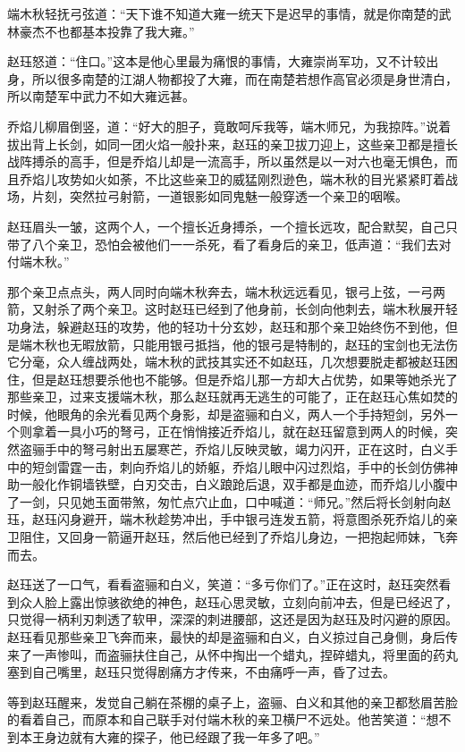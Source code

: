 端木秋轻抚弓弦道：“天下谁不知道大雍一统天下是迟早的事情，就是你南楚的武林豪杰不也都基本投靠了我大雍。”

赵珏怒道：“住口。”这本是他心里最为痛恨的事情，大雍崇尚军功，又不计较出身，所以很多南楚的江湖人物都投了大雍，而在南楚若想作高官必须是身世清白，所以南楚军中武力不如大雍远甚。

乔焰儿柳眉倒竖，道：“好大的胆子，竟敢呵斥我等，端木师兄，为我掠阵。”说着拔出背上长剑，如同一团火焰一般扑来，赵珏的亲卫拔刀迎上，这些亲卫都是擅长战阵搏杀的高手，但是乔焰儿却是一流高手，所以虽然是以一对六也毫无惧色，而且乔焰儿攻势如火如荼，不比这些亲卫的威猛刚烈逊色，端木秋的目光紧紧盯着战场，片刻，突然拉弓射箭，一道银影如同鬼魅一般穿透一个亲卫的咽喉。

赵珏眉头一皱，这两个人，一个擅长近身搏杀，一个擅长远攻，配合默契，自己只带了八个亲卫，恐怕会被他们一一杀死，看了看身后的亲卫，低声道：“我们去对付端木秋。”

那个亲卫点点头，两人同时向端木秋奔去，端木秋远远看见，银弓上弦，一弓两箭，又射杀了两个亲卫。这时赵珏已经到了他身前，长剑向他刺去，端木秋展开轻功身法，躲避赵珏的攻势，他的轻功十分玄妙，赵珏和那个亲卫始终伤不到他，但是端木秋也无暇放箭，只能用银弓抵挡，他的银弓是特制的，赵珏的宝剑也无法伤它分毫，众人缠战两处，端木秋的武技其实还不如赵珏，几次想要脱走都被赵珏困住，但是赵珏想要杀他也不能够。但是乔焰儿那一方却大占优势，如果等她杀光了那些亲卫，过来支援端木秋，那么赵珏就再无逃生的可能了，正在赵珏心焦如焚的时候，他眼角的余光看见两个身影，却是盗骊和白义，两人一个手持短剑，另外一个则拿着一具小巧的弩弓，正在悄悄接近乔焰儿，就在赵珏留意到两人的时候，突然盗骊手中的弩弓射出五屡寒芒，乔焰儿反映灵敏，竭力闪开，正在这时，白义手中的短剑雷霆一击，刺向乔焰儿的娇躯，乔焰儿眼中闪过烈焰，手中的长剑仿佛神助一般化作铜墙铁壁，白刃交击，白义踉跄后退，双手都是血迹，而乔焰儿小腹中了一剑，只见她玉面带煞，匆忙点穴止血，口中喊道：“师兄。”然后将长剑射向赵珏，赵珏闪身避开，端木秋趁势冲出，手中银弓连发五箭，将意图杀死乔焰儿的亲卫阻住，又回身一箭逼开赵珏，然后他已经到了乔焰儿身边，一把抱起师妹，飞奔而去。

赵珏送了一口气，看看盗骊和白义，笑道：“多亏你们了。”正在这时，赵珏突然看到众人脸上露出惊骇欲绝的神色，赵珏心思灵敏，立刻向前冲去，但是已经迟了，只觉得一柄利刃刺透了软甲，深深的刺进腰部，这还是因为赵珏及时闪避的原因。赵珏看见那些亲卫飞奔而来，最快的却是盗骊和白义，白义掠过自己身侧，身后传来了一声惨叫，而盗骊扶住自己，从怀中掏出一个蜡丸，捏碎蜡丸，将里面的药丸塞到自己嘴里，赵珏只觉得剧痛方才传来，不由痛呼一声，昏了过去。

等到赵珏醒来，发觉自己躺在茶棚的桌子上，盗骊、白义和其他的亲卫都愁眉苦脸的看着自己，而原本和自己联手对付端木秋的亲卫横尸不远处。他苦笑道：“想不到本王身边就有大雍的探子，他已经跟了我一年多了吧。”

